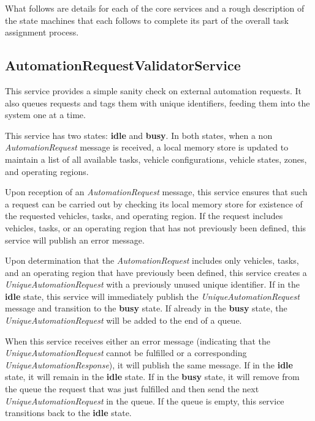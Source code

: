 What follows are details for each of the core services and a rough description of the state machines
that each follows to complete its part of the overall task assignment process.

\subsection{AutomationRequestValidatorService}\label{automationrequestvalidatorservice}

This service provides a simple sanity check on external automation
requests. It also queues requests and tags them with unique identifiers,
feeding them into the system one at a time.

This service has two states: \textbf{idle} and \textbf{busy}. In both
states, when a non \emph{AutomationRequest} message is received, a local
memory store is updated to maintain a list of all available tasks,
vehicle configurations, vehicle states, zones, and operating regions.

Upon reception of an \emph{AutomationRequest} message, this service
ensures that such a request can be carried out by checking its local
memory store for existence of the requested vehicles, tasks, and
operating region. If the request includes vehicles, tasks, or an
operating region that has not previously been defined, this service will
publish an error message.

Upon determination that the \emph{AutomationRequest} includes only
vehicles, tasks, and an operating region that have previously been
defined, this service creates a \emph{UniqueAutomationRequest} with a
previously unused unique identifier. If in the \textbf{idle} state, this
service will immediately publish the \emph{UniqueAutomationRequest}
message and transition to the \textbf{busy} state. If already in the
\textbf{busy} state, the \emph{UniqueAutomationRequest} will be added to
the end of a queue.

When this service receives either an error message (indicating that the
\emph{UniqueAutomationRequest} cannot be fulfilled or a corresponding
\emph{UniqueAutomationResponse}), it will publish the same message. If
in the \textbf{idle} state, it will remain in the \textbf{idle} state.
If in the \textbf{busy} state, it will remove from the queue the request
that was just fulfilled and then send the next
\emph{UniqueAutomationRequest} in the queue. If the queue is empty, this
service transitions back to the \textbf{idle} state.

